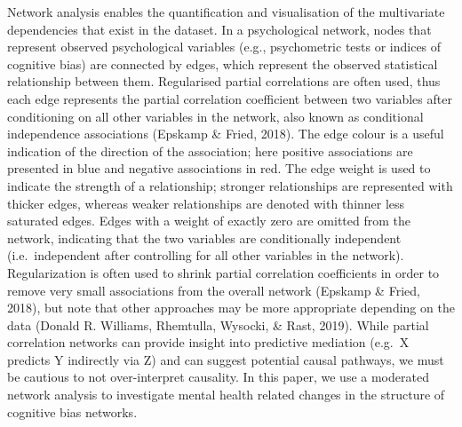 \documentclass[
  english,
  man]{apa6}
\begin{document}
Network analysis enables the quantification and visualisation of the multivariate dependencies that exist in the dataset. In a psychological network, nodes that represent observed psychological variables (e.g., psychometric tests or indices of cognitive bias) are connected by edges, which represent the observed statistical relationship between them. Regularised partial correlations are often used, thus each edge represents the partial correlation coefficient between two variables after conditioning on all other variables in the network, also known as conditional independence associations (Epskamp \& Fried, 2018). The edge colour is a useful indication of the direction of the association; here positive associations are presented in blue and negative associations in red. The edge weight is used to indicate the strength of a relationship; stronger relationships are represented with thicker edges, whereas weaker relationships are denoted with thinner less saturated edges. Edges with a weight of exactly zero are omitted from the network, indicating that the two variables are conditionally independent (i.e.~independent after controlling for all other variables in the network). Regularization is often used to shrink partial correlation coefficients in order to remove very small associations from the overall network (Epskamp \& Fried, 2018), but note that other approaches may be more appropriate depending on the data (Donald R. Williams, Rhemtulla, Wysocki, \& Rast, 2019). While partial correlation networks can provide insight into predictive mediation (e.g.~X predicts Y indirectly via Z) and can suggest potential causal pathways, we must be cautious to not over-interpret causality. In this paper, we use a moderated network analysis to investigate mental health related changes in the structure of cognitive bias networks.
\end{document}
